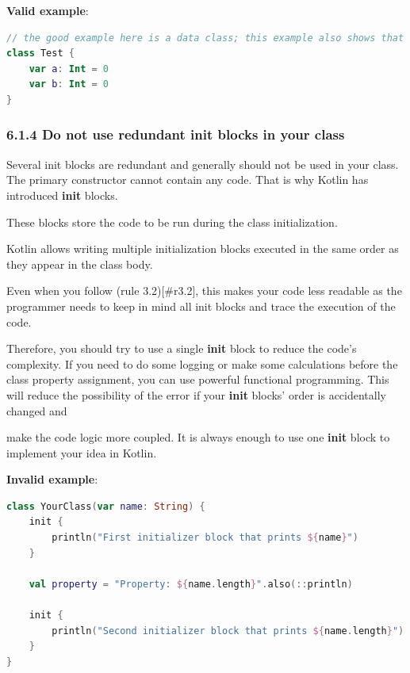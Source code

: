 \textbf{Valid example}:

\begin{lstlisting}[language=Kotlin]
// the good example here is a data class; this example also shows that you should get rid of braces for the primary constructor
class Test {
    var a: Int = 0
    var b: Int = 0
}
\end{lstlisting}


\subsubsection*{\textbf{6.1.4 Do not use redundant init blocks in your class}}
\leavevmode\newline

\label{sec:6.1.4}

Several init blocks are redundant and generally should not be used in your class. The primary constructor cannot contain any code. That is why Kotlin has introduced \textbf{init} blocks.

These blocks store the code to be run during the class initialization.

Kotlin allows writing multiple initialization blocks executed in the same order as they appear in the class body.

Even when you follow (rule 3.2)[\#r3.2], this makes your code less readable as the programmer needs to keep in mind all init blocks and trace the execution of the code.

Therefore, you should try to use a single \textbf{init} block to reduce the code's complexity. If you need to do some logging or make some calculations before the class property assignment, you can use powerful functional programming. This will reduce the possibility of the error if your \textbf{init} blocks' order is accidentally changed and

make the code logic more coupled. It is always enough to use one \textbf{init} block to implement your idea in Kotlin.



\textbf{Invalid example}:

\begin{lstlisting}[language=Kotlin]
class YourClass(var name: String) {    
    init {
        println("First initializer block that prints ${name}")
    }
    
    val property = "Property: ${name.length}".also(::println)
    
    init {
        println("Second initializer block that prints ${name.length}")
    }
}
\end{lstlisting}


